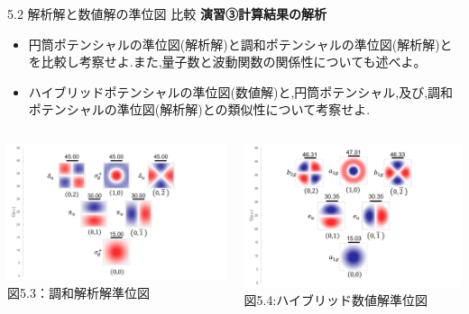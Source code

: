 \documentclass{beamer}
\begin{document}
 \begin{frame}{5.2 解析解と数値解の準位図
    比較}
  \textbf{演習③\quad 計算結果の解析}
        \begin{itemize}
          \item 円筒ポテンシャルの準位図(解析解)と調和ポテンシャルの準位図(解析解)とを比較し考察せよ.また,量子数と波動関数の関係性についても述べよ。
          \item ハイブリッドポテンシャルの準位図(数値解)と,円筒ポテンシャル,及び,調和ポテンシャルの準位図(解析解)との類似性について考察せよ.
        \end{itemize}
        

        
        \begin{columns}[t]

          \begin{center}
            \includegraphics[width=1.30\linewidth]{images/調和準位図.png} \\
            \scriptsize 図5.3：調和解析解準位図
          \end{center}


          \begin{center}
            \includegraphics[width=1.30\linewidth]{images/ハイブリッド準位図.png} \\
            \scriptsize 図5.4:ハイブリッド数値解準位図
          \end{center}
          


\end{columns}
\end{frame}
\end{document}
